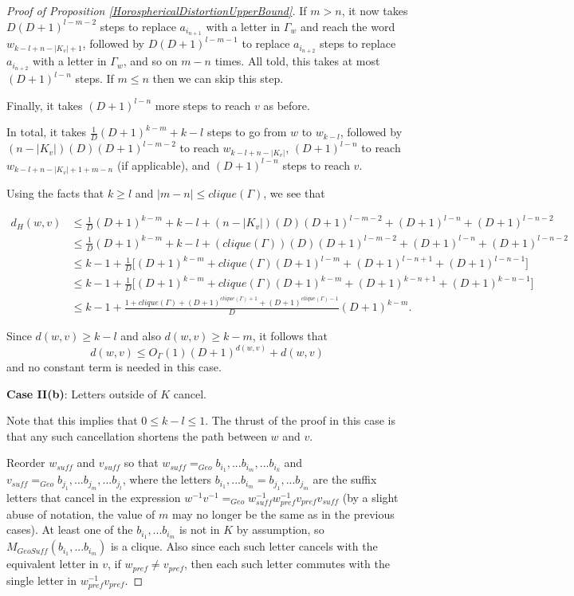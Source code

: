 \documentclass{amsart}
\theoremstyle{definition}
\theoremstyle{remark}
\begin{document}
\begin{proof} [Proof of Proposition \ref{HorosphericalDistortionUpperBound}]
		If $m>n$, it now takes $D(D+1)^{l-m-2}$ steps to replace $a_{i_{n+1}}$ with a letter in $\Gamma_w$ and reach the word $w_{k-l+n-|K_v|+1}$, followed by $D(D+1)^{l-m-1}$ to replace $a_{i_{n+2}}$ steps to replace $a_{i_{n+2}}$ with a letter in $\Gamma_w$, and so on $m-n$ times. All told, this takes at most $(D+1)^{l-n}$ steps. If $m\le n$ then we can skip this step.
		
		Finally, it takes $(D+1)^{l-n}$ more steps to reach $v$ as before.
		
		In total, it takes $\frac{1}{D}(D+1)^{k-m}+k-l$ steps to go from $w$ to $w_{k-l}$, followed by \newline $(n-|K_v|)(D)(D+1)^{l-m-2}$ to reach $w_{k-l+n-|K_v|}$, $(D+1)^{l-n}$ to reach $w_{k-l+n-|K_v|+1+m-n}$ (if applicable), and $(D+1)^{l-n}$ steps to reach $v$.
		
		Using the facts that $k\ge l$ and $|m-n|\le clique(\Gamma)$, we see that
		
		\begin{align*}
			d_H(w,v) & \le \frac{1}{D}(D+1)^{k-m} + k-l + (n-|K_v|)(D)(D+1)^{l-m-2} + (D+1)^{l-n} + (D+1)^{l-n-2}\\
			&\le \frac{1}{D}(D+1)^{k-m} + k-l + (clique(\Gamma))(D)(D+1)^{l-m-2} + (D+1)^{l-n} + (D+1)^{l-n-2}\\
			&\le k-1+ \frac{1}{D} \bigl[ (D+1)^{k-m}+clique(\Gamma)(D+1)^{l-m}+(D+1)^{l-n+1}+(D+1)^{l-n-1}\bigr]\\
			&\le k-1+ \frac{1}{D}\bigl[ (D+1)^{k-m}+clique(\Gamma)(D+1)^{k-m}+(D+1)^{k-n+1}+(D+1)^{k-n-1}\bigr]\\
			&\le k-1 + \frac{1+clique(\Gamma)+(D+1)^{clique(\Gamma)+1}+(D+1)^{clique(\Gamma)-1}}{D} (D+1)^{k-m}.
		\end{align*}
		
		Since $d(w,v)\ge k-l$ and also $d(w,v)\ge k-m$, it follows that $$d(w,v) \le O_\Gamma(1)(D+1)^{d(w,v)}+d(w,v)$$ and no constant term is needed in this case.
		
		\textbf{Case II(b)}: Letters outside of $K$ cancel.
		
		Note that this implies that $0\le k-l\le 1$. The thrust of the proof in this case is that any such cancellation shortens the path between $w$ and $v$. 
		
		Reorder $w_{suff}$ and $v_{suff}$ so that $w_{suff}=_{Geo}b_{i_1}, ... b_{i_m}, ... b_{i_k}$ and $v_{suff}=_{Geo}b_{j_1}, ... b_{j_m}, ... b_{j_l}$, where the letters $b_{i_1}, ... b_{i_m} = b_{j_1}, ... b_{j_m}$ are the suffix letters that cancel in the expression $w^{-1}v^{-1}=_{Geo}w_{suff}^{-1}w_{pref}^{-1}v_{pref}v_{suff}$ (by a slight abuse of notation, the value of $m$ may no longer be the same as in the previous cases). At least one of the $b_{i_1}, ... b_{i_m}$ is not in $K$ by assumption, so $M_{GeoSuff}(b_{i_1}, ... b_{i_m})$ is a clique. Also since each such letter cancels with the equivalent letter in $v$, if $w_{pref}\ne v_{pref}$, then each such letter commutes with the single letter in $w_{pref}^{-1}v_{pref}$. 
		

\end{proof}
\end{document}
